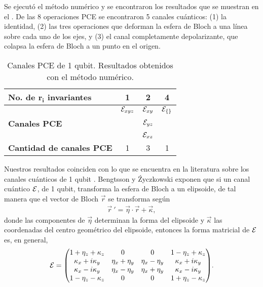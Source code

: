 Se ejecutó el método numérico y se encontraron los
resultados que se muestran en el .
De las 8 operaciones PCE se encontraron 5 canales cuánticos:
(1) la identidad, (2) las tres operaciones 
que deforman la esfera de Bloch a una línea sobre cada uno 
de los ejes, y (3) el canal completamente depolarizante, 
que colapsa la esfera de Bloch a un punto en el origen.

\begin{table}
\centering
\begin{tabular}{|l|c|c|c|}
\hline
\textbf{No. de $\mathbf{r_i}$ invariantes} & \textbf{1} & \textbf{2} &  \textbf{4}\\
\hline 
 & $\mathcal{E}_{xyz}$ & $\mathcal{E}_{xy}$ & $\mathcal{E}_{\{\}}$ \\ 
\textbf{Canales PCE} &  & $\mathcal{E}_{yz}$ &  \\ 
 & & $\mathcal{E}_{xz}$ &  \\ 
\hline
\textbf{Cantidad de canales PCE} & 1 & 3 & 1 \\
\hline
\end{tabular} 
\caption{Canales PCE de 1 qubit. Resultados
obtenidos con el método numérico.}
\label{c:resultados-1q}
\end{table}

Nuestros resultados coinciden con lo que se encuentra 
en la literatura sobre los canales cuánticos 
de 1 qubit \cite{bengtsson_zyczkowski_2017}
\cite{nielsen_chuang_2011}. Bengtsson y 
Źyczkowski exponen que si un canal cuántico $\mathcal{E}$, de 1 qubit,
transforma la esfera de Bloch a un elipsoide, de
tal manera que el vector de Bloch $\vec{r}$ 
se transforma según  
\begin{align}
\vec{r}\ '=\vec{\eta}\cdot\vec{r}+\vec{\kappa},
\end{align}
donde las componentes de $\vec{\eta}$ determinan 
la forma del elipsoide y $\vec{\kappa}$ las coordenadas del 
centro geométrico del elipsoide, entonces
la forma matricial de $\mathcal{E}$ es, en general,
\begin{align}
\E =
\mqty(
1+\eta_z+\kappa_z & 0 & 0 & 1-\eta_z+\kappa_z \\
\kappa_x+i\kappa_y & \eta_x+\eta_y & \eta_x-\eta_y & \kappa_x+i\kappa_y\\
\kappa_x-i\kappa_y & \eta_x-\eta_y & \eta_x+\eta_y & \kappa_x-i\kappa_y\\
1-\eta_z-\kappa_z & 0 & 0 & 1+\eta_z-\kappa_z
).
\end{align}

